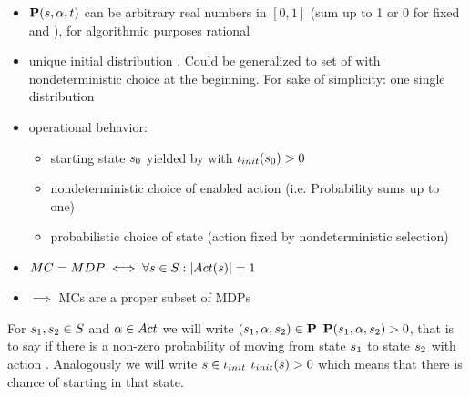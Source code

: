 \documentclass[preview]{standalone}
\begin{document}
\begin{itemize}
	\item ${\textbf{P}}({s}, {\alpha}, t)$ can be arbitrary real numbers in $[0,1]$ (sum up to 1 or 0 for fixed \state and \action), for algorithmic purposes rational
	\item unique initial distribution \initdistrib. Could be generalized to set of \initdistrib with nondeterministic choice at the beginning. For sake of simplicity: one single distribution
	\item operational behavior:
	\begin{itemize}
		\item starting state ${s}_0$ yielded by \initdistrib with ${\iota_{init}}({s}_0) > 0$
		\item nondeterministic choice of enabled action (i.e. Probability sums up to one)
		\item probabilistic choice of state (action fixed by nondeterministic selection)
	\end{itemize}
	
	\item $MC = MDP \iff \forall {s} \in {S} : |{Act}({s})| = 1$
	
	\item $\implies$ MCs are a proper subset of MDPs
	
\end{itemize}



For ${s}_1, {s}_2 \in {S}$ and ${\alpha} \in {Act}$ we will write $({s}_1, {\alpha}, {s}_2) \in {\textbf{P}}$ \iffN ${\textbf{P}}({s}_1, {\alpha}, {s}_2) > 0$, that is to say if there is a non-zero probability of moving from state ${s}_1$ to state ${s}_2$ with action \action. Analogously we will write ${s} \in {\iota_{init}}$ \iffN ${\iota_{init}}({s}) > 0$ which means that there is chance of starting in that state.


	
\end{document}

